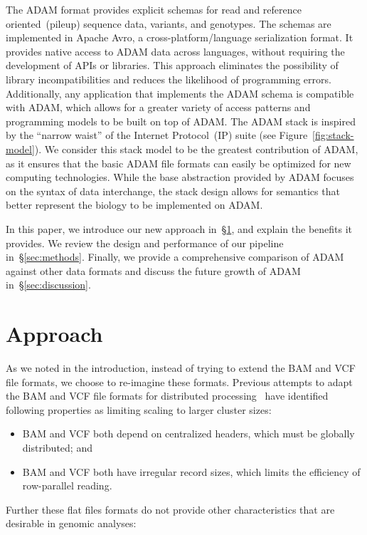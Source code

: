 \documentclass{bioinfo}
\begin{document}
The ADAM format provides explicit schemas for read and reference oriented~(pileup) sequence data, variants, and genotypes. The schemas are implemented in Apache
Avro, a cross-platform/language serialization format. It provides native access to ADAM data across languages, without requiring the development of APIs or libraries.
This approach eliminates the possibility of library incompatibilities and reduces the likelihood of programming errors. Additionally, any application that implements the
ADAM schema is compatible with ADAM, which allows for a greater variety of access patterns and programming models to be built on top of ADAM. The ADAM stack is inspired
by the ``narrow waist'' of the Internet Protocol~(IP) suite (see Figure~\ref{fig:stack-model}). We consider this stack model to be the greatest contribution of ADAM, as it ensures
that the basic ADAM file formats can easily be optimized for new computing technologies. While the base abstraction provided by ADAM focuses on the syntax of data
interchange, the stack design allows for semantics that better represent the biology to be implemented on ADAM.

In this paper, we introduce our new approach in~\S\ref{sec:approach}, and explain the benefits it provides. We review the design and performance of our pipeline
in~\S\ref{sec:methods}. Finally, we provide a comprehensive comparison of ADAM against other data formats and discuss the future growth of ADAM in~\S\ref{sec:discussion}.

\section{Approach}
\label{sec:approach}

As we noted in the introduction, instead of trying to extend the BAM and VCF file formats, we choose to re-imagine these formats. Previous attempts to adapt the
BAM and VCF file formats for distributed processing~\citep[see][]{niemenmaa12} have identified following properties as limiting scaling to larger cluster sizes:

\begin{itemize}
\item BAM and VCF both depend on centralized headers, which must be globally distributed; and
\item BAM and VCF both have irregular record sizes, which limits the efficiency of row-parallel reading. 
\end{itemize}

Further these flat files formats do not provide other characteristics that are desirable in genomic analyses:
\end{document}
